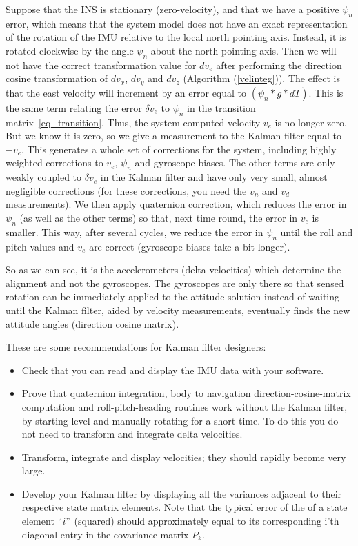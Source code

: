 \documentclass[journal]{IEEEtran}
\begin{document}
Suppose that the INS is stationary (zero-velocity), and that we have a positive $\psi_n$ error, which means that the system model does not have an exact representation of the rotation of the IMU relative to the local north pointing axis. Instead, it is rotated clockwise by the angle $\psi_n$ about the north pointing axis.
 Then we will not have the correct transformation value for $dv_e$ after performing the direction cosine transformation of $dv_x$, $dv_y$ and $dv_z$ (Algorithm (\ref{velinteg})). The effect is that the east velocity will increment by an error equal to $(\psi_n * g * dT)$. This is the same  term relating the error $\delta v_e$ to $\psi_n$ in the transition matrix~\eqref{eq_transition}. Thus, the system computed velocity $v_e$ is no longer zero. But we know it is zero, so we give a measurement to the Kalman filter equal to $-v_e$. This generates a whole set of corrections for the system, including highly weighted corrections to $v_e$, $\psi_n$ and gyroscope biases. The other terms are only weakly coupled to $\delta v_e$ in the Kalman filter and have only very small, almost negligible corrections (for these corrections, you need the $v_n$ and $v_d$ measurements). We then apply quaternion correction, which reduces the error in $\psi_n$ (as well as the other terms) so that, next time round,  the error in $v_e$ is smaller. This way, after several cycles, we reduce the error in $\psi_n$  until the roll and pitch values and $v_e$ are correct (gyroscope biases take a bit longer).\par
So as we can see, it is the accelerometers (delta velocities) which determine the alignment and not the gyroscopes. The gyroscopes are only there so that sensed rotation can be immediately applied to the attitude solution instead of waiting until the Kalman filter, aided by velocity measurements, eventually finds the new attitude angles (direction cosine matrix).


These are some recommendations for Kalman filter designers:
\begin{itemize}[label={\tiny\raisebox{1ex}{\textbullet}}]
\item  Check that you can read and display the IMU data with your software.
\item Prove that quaternion integration, body to navigation direction-cosine-matrix computation and roll-pitch-heading routines  work without the Kalman filter, by starting level and manually rotating for a short time. To do this you do not need to transform and integrate delta velocities. 
\item Transform, integrate and display velocities; they should rapidly become very large.
\item Develop your Kalman filter by displaying all the variances adjacent to their respective state matrix elements.  Note that the typical error of the of a state element $``i"$ (squared) should approximately equal to its corresponding i'th diagonal entry in the  covariance matrix $P_k$.

\end{itemize} 
\end{document}
